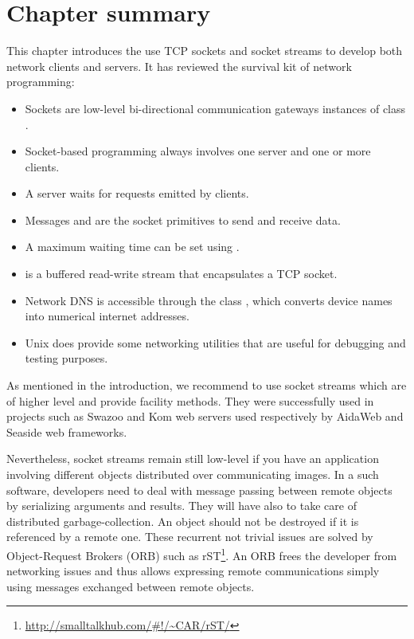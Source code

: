\documentclass[a4paper,10pt,twoside]{book}
\begin{document}
\section{Chapter summary}
This chapter introduces the use TCP sockets and socket streams to develop both network clients and servers. It has reviewed the survival kit of network programming:

\begin{itemize}
\item Sockets are low-level bi-directional communication gateways instances of class .
\item Socket-based programming always involves one server and one or more clients.
\item A server waits for requests emitted by clients.
\item Messages  and  are the socket primitives to send and receive data.
\item A maximum waiting time can be set using .
\item {} is a buffered read-write stream that encapsulates a TCP socket.
\item Network DNS is accessible through the class , which converts device names into numerical internet addresses.
\item Unix does provide some networking utilities that are useful for debugging and testing purposes.
\end{itemize}

As mentioned in the introduction, we recommend to use socket streams which are of higher level and provide facility methods.
They were successfully used in projects such as Swazoo and Kom web servers used respectively by AidaWeb and Seaside web frameworks.

Nevertheless, socket streams remain still low-level if you have an application involving different objects distributed over communicating images.
In a such software, developers need to deal with message passing between remote objects by serializing arguments and results.
They will have also to take care of distributed garbage-collection.
An object should not be destroyed if it is referenced by a remote one.
These recurrent not trivial issues are solved by Object-Request Brokers (ORB) such as rST\footnote{\url{http://smalltalkhub.com/\#!/\~CAR/rST/}}.
An ORB frees the developer from networking issues and thus allows expressing remote communications simply using messages exchanged between remote objects.


\ifx\wholebook\relax\else
\end{document}
